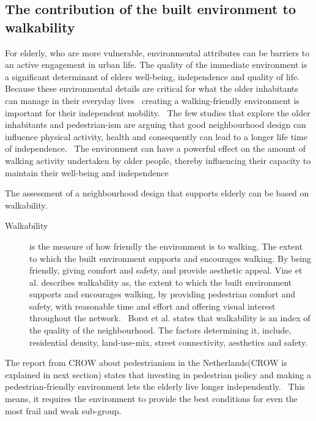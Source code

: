 \subsection{The contribution of the built environment to walkability}
For elderly, who are more vulnerable, environmental attributes can be barriers to an active engagement in urban life. The quality of the immediate environment is a significant determinant of elders well-being, independence and quality of life.~\cite{Vine2012} Because these environmental details are critical for what the older inhabitants can manage in their everyday lives~\cite{Stahl2013, Stahl2008, Clarke2011, Annear2014} creating a walking-friendly environment is important for their independent mobility.~\cite{Sauter2010} The few studies that explore the older inhabitants and pedestrian-ism are arguing that good neighbourhood design can influence physical activity, health and consequently can lead to a longer life time of independence.~\cite{Vine2012, Rantakokko2009, Phillips2013, Beard2009, Rosso2011, Clarke2011}
The environment can have a powerful effect on the amount of walking activity undertaken by older people, thereby influencing their capacity to maintain their well-being and independence~\cite{Vine2012}

The assessment of a neighbourhood design that supports elderly can be based on walkability. \begin{description}\item[Walkability] is the measure of how friendly the environment is to walking. The extent to which the built environment supports and encourages walking. By being friendly, giving comfort and safety, and provide aesthetic appeal. 
Vine et al. describes walkability as, the extent to which the built environment supports and encourages walking, by providing pedestrian comfort and safety, with reasonable time and effort and offering visual interest throughout the network.~\cite{Vine2012} Borst et al. states that walkability is an index of the quality of the neighbourhood. The factors determining it, include, residential density, land-use-mix, street connectivity, aesthetics and safety.~\cite{Borst2008} \end{description}

The report from CROW about pedestrianism in the Netherlands(CROW is explained in next section) states that investing in pedestrian policy and making a pedestrian-friendly environment lets the elderly live longer independently.~\cite{Eijnde2011, Crow2014} This means, it requires the environment to provide the best conditions for even the most frail and weak sub-group.


